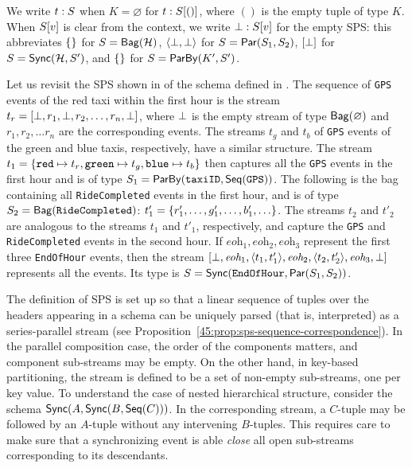 We write $t: \ss$ when $K = \varnothing$ for $t: \spstype{()}{\ss}$, where $()$ is the empty tuple of type $K$.
When $\spstype{v}{\ss}$ is clear from the context,
we write $\spsemp: \spstype{v}{\ss}$ for the empty SPS:
this abbreviates $\spsbag{}$ for $\ss = \relleaf{\mathcal{H}}$,
$\spspar{\spsemp}{\spsemp}$ for $\ss = \parcomp{S_1}{S_2}$,
$\spsseq{\bot}$ for $\ss = \hier{\mathcal{H}}{S'}$,
and $\spsbag{}$ for $\ss = \keyby{K'}{S'}$.

\newcommand{\eohevent}{\textit{eoh}}
\begin{example}
\label{45:ex:text-sps}
Let us revisit the SPS shown in  of the schema defined in .
The sequence of \texttt{GPS} events of the red taxi within the first hour is
the stream $t_r=[\spsemp,r_1,\spsemp,r_2,\ldots, r_n,\spsemp]$, where $\spsemp$ is the empty stream of type
$\relleaf{\varnothing}$
and $r_1, r_2, \ldots r_n$ are the corresponding events.
The streams $t_g$ and $t_b$ of \texttt{GPS} events of the green and blue taxis, respectively, have a similar structure.
The stream $t_1 = \spsbag{\keyed{\texttt{red}}{t_r},\keyed{\texttt{green}}{t_g},\keyed{\texttt{blue}}{t_b} }$ then captures all the \texttt{GPS} events in the first hour and is of type
$S_1 = \keyby{\texttt{taxiID}}{\seqleaf{\texttt{GPS}}}$.
The following is the bag containing
all \texttt{RideCompleted} events in the first hour,
and is of type $S_2 = \relleaf{\texttt{RideCompleted}}$:
$t'_1=\spsbag{r'_1,\ldots,g'_1,\ldots,b'_1,\ldots}$.
The streams $t_2$ and $t'_2$ are analogous to the streams $t_1$ and $t'_1$, respectively,
and capture the \texttt{GPS}  and \texttt{RideCompleted} events in the second hour.
If $\eohevent_1, \eohevent_2, \eohevent_3$ represent the first three \texttt{EndOfHour} events,
then the stream
$[\spsemp,\eohevent_1,\spspar{t_1}{t'_1},\eohevent_2,\spspar{t_2}{t'_2},\eohevent_3,\spsemp]$
represents all the events.
Its type is $S = \hier{\texttt{EndOfHour}}{\parcomp{S_1}{S_2}}$.
\end{example}

The definition of SPS is set up so that a linear sequence of tuples over the headers
appearing in a schema can be uniquely parsed (that is, interpreted) as a series-parallel
stream (see Proposition~\ref{45:prop:sps-sequence-correspondence}). In the parallel composition case, the order of the components matters, and component sub-streams may be empty. On the other hand, in key-based
partitioning, the stream is defined to be a set of non-empty sub-streams, one per key value.
To understand the case of nested hierarchical structure, consider the schema
$\hier{A}{\hier{B}{\seqleaf{C}}}$. In the corresponding stream,
a $C$-tuple may be followed by an $A$-tuple without any intervening $B$-tuples.
This requires care to make sure that a synchronizing event is able \emph{close}
all open sub-streams corresponding to its descendants.

